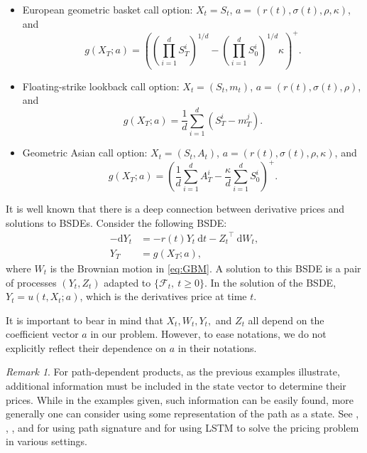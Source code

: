 \documentclass[11pt,a4paper]{article}
\theoremstyle{remark}
\newtheorem{remark}{Remark}
\begin{document}
	\begin{itemize}
		\item European geometric basket call option: $X_t=S_t$, $a=(r(t), \sigma(t), \rho, \kappa)$, and 
		\begin{equation}
			g(X_T;a)=\left(\left(\prod_{i=1}^d S^i_T\right)^{1/d} - \left(\prod_{i=1}^d S^i_0\right)^{1/d}\kappa\right)^+.
		\end{equation}
		
		\item Floating-strike lookback call option: $X_t=(S_t, m_t)$, $a=(r(t),\sigma(t),\rho)$, and 
		\begin{equation}
			g(X_T;a) = \frac{1}{d}\sum_{i=1}^d (S^i_T - m^j_T).
		\end{equation}
		
		\item Geometric Asian call option: $X_t=(S_t, A_t)$, $a=(r(t), \sigma(t), \rho, \kappa)$, and 
		\begin{equation}
			g(X_T;a) = \left(\frac{1}{d}\sum_{i=1}^d A^i_T - \frac{\kappa}{d}\sum_{i=1}^d S^i_0 \right)^+.
		\end{equation}
	\end{itemize}
	
	It is well known that there is a deep connection between derivative prices and solutions to BSDEs. Consider the following BSDE:
	\begin{align}\label{eq:BSDE}
		-\mathrm{d} Y_t &=-r(t) Y_t \mathrm{~d} t- {Z_t}^{\top} \mathrm{~d} W_t, \\
		Y_T &= g(X_T;a),  
	\end{align}
	where $W_t$ is the Brownian motion in \eqref{eq:GBM}. A solution to this BSDE is a pair of processes $(Y_t,Z_t)$ adapted to $\{\mathcal{F}_t,\ t\ge 0\}$. In the solution of the BSDE, $Y_t = u(t, X_t; a)$, which is the derivatives price at time $t$. 
	
	It is important to bear in mind that $X_t, W_t, Y_t,$ and $Z_t$ all depend on the coefficient vector $a$ in our problem. However, to ease notations, we do not explicitly reflect their dependence on $a$ in their notations. 
	
	\begin{remark}
		For path-dependent products, as the previous examples illustrate, additional information must be included in the state vector to determine their prices. While in the examples given, such information can be easily found, more generally one can consider using some representation of the path as a state. See \cite{sabate2020solving}, \cite{jacquier2019deep}, \cite{feng2021deep}, and \cite{bayraktar2022deep} for using path signature and \cite{saporito2020pdgm} for using LSTM to solve the pricing problem in various settings.
	\end{remark}
	
\end{document}
